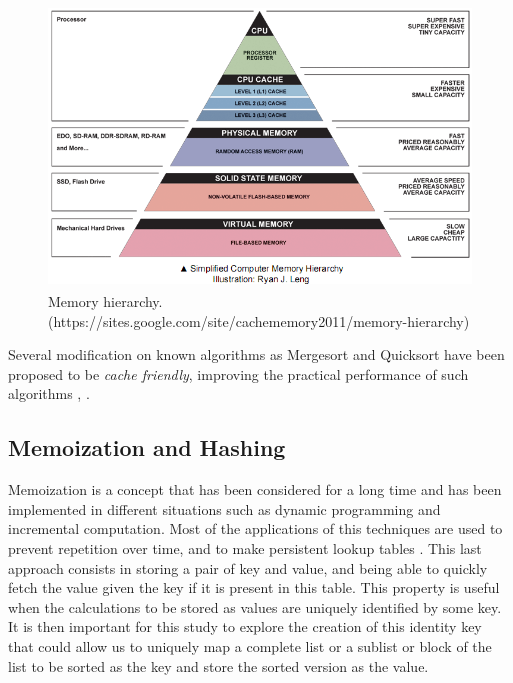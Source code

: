 \documentclass[a4paper,12pt]{article}
\begin{document}
\begin{figure}[H]
\centering
\includegraphics[height=7.5cm,keepaspectratio]{./images/ComputerMemoryHierarchy.png}
\caption{Memory hierarchy. (https://sites.google.com/site/cachememory2011/memory-hierarchy)}
\label{fig:Memory}
\end{figure}

Several modification on known algorithms as Mergesort and Quicksort have been proposed to be {\it cache friendly}, improving the practical performance of such algorithms \cite{lamarca1999influence},  \cite{xiao2000improving}.


\subsection{Memoization and Hashing} \label{memoHash}

Memoization is a concept that has been considered for a long time and has been implemented in different situations \cite{acar2003selective} such as dynamic programming and incremental computation. Most of the applications of this techniques are used to prevent repetition over time, and to make persistent lookup tables \cite{hall1997improving}. This last approach consists in storing a pair of key and value, and being able to quickly fetch the value given the key if it is present in this table. This property is useful when the calculations to be stored as values are uniquely identified by some key. \\

It is then important for this study to explore the creation of this identity key that could allow us to uniquely map a complete list or a sublist or block of the list to be sorted as the key and store the sorted version as the value. \\
\end{document}
